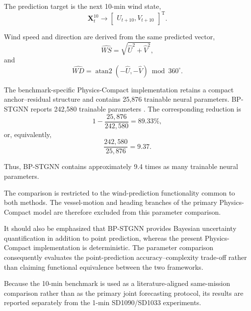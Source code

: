 The prediction target is the next 10-min wind state,
\begin{equation}
\boxed{
\mathbf X_t^{10}
\longrightarrow
\begin{bmatrix}
U_{t+10},
V_{t+10}
\end{bmatrix}^{\mathrm T}
}.
\label{eq:bp_target}
\end{equation}

Wind speed and direction are derived from the same predicted vector,
\begin{equation}
\widehat{WS}
=
\sqrt{
\hat U^2
+
\hat V^2
},
\label{eq:bp_ws}
\end{equation}
and
\begin{equation}
\widehat{WD}
=
\operatorname{atan2}
\left(
-\hat U,
-\hat V
\right)
\bmod 360^\circ.
\label{eq:bp_wd}
\end{equation}

The benchmark-specific Physics-Compact implementation retains a compact anchor--residual structure and contains 25,876 trainable neural parameters. BP-STGNN reports 242,580 trainable parameters \cite{Nie2026}. The corresponding reduction is
\begin{equation}
1
-
\frac{
25{,}876
}{
242{,}580
}
=
\boxed{
89.33\%
},
\label{eq:bp_param_reduction}
\end{equation}
or, equivalently,
\begin{equation}
\frac{
242{,}580
}{
25{,}876
}
=
\boxed{
9.37
}.
\label{eq:bp_param_ratio}
\end{equation}

Thus, BP-STGNN contains approximately 9.4 times as many trainable neural parameters.

The comparison is restricted to the wind-prediction functionality common to both methods. The vessel-motion and heading branches of the primary Physics-Compact model are therefore excluded from this parameter comparison.

It should also be emphasized that BP-STGNN provides Bayesian uncertainty quantification in addition to point prediction, whereas the present Physics-Compact implementation is deterministic. The parameter comparison consequently evaluates the point-prediction accuracy--complexity trade-off rather than claiming functional equivalence between the two frameworks.

Because the 10-min benchmark is used as a literature-aligned same-mission comparison rather than as the primary joint forecasting protocol, its results are reported separately from the 1-min SD1090/SD1033 experiments.

